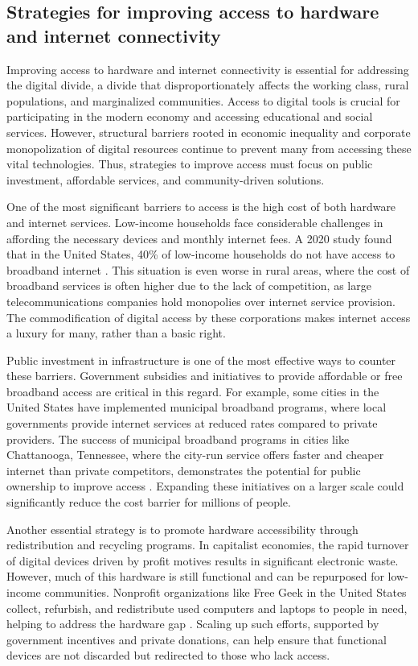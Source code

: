 \begin{refsection}
\subsection{Strategies for improving access to hardware and internet connectivity}

Improving access to hardware and internet connectivity is essential for addressing the digital divide, a divide that disproportionately affects the working class, rural populations, and marginalized communities. Access to digital tools is crucial for participating in the modern economy and accessing educational and social services. However, structural barriers rooted in economic inequality and corporate monopolization of digital resources continue to prevent many from accessing these vital technologies. Thus, strategies to improve access must focus on public investment, affordable services, and community-driven solutions.

One of the most significant barriers to access is the high cost of both hardware and internet services. Low-income households face considerable challenges in affording the necessary devices and monthly internet fees. A 2020 study found that in the United States, 40\% of low-income households do not have access to broadband internet \cite[pp.~56-58]{pickdigitaldivide}. This situation is even worse in rural areas, where the cost of broadband services is often higher due to the lack of competition, as large telecommunications companies hold monopolies over internet service provision. The commodification of digital access by these corporations makes internet access a luxury for many, rather than a basic right.

Public investment in infrastructure is one of the most effective ways to counter these barriers. Government subsidies and initiatives to provide affordable or free broadband access are critical in this regard. For example, some cities in the United States have implemented municipal broadband programs, where local governments provide internet services at reduced rates compared to private providers. The success of municipal broadband programs in cities like Chattanooga, Tennessee, where the city-run service offers faster and cheaper internet than private competitors, demonstrates the potential for public ownership to improve access \cite[pp.~75-78]{fuchscriticalcommunication}. Expanding these initiatives on a larger scale could significantly reduce the cost barrier for millions of people.

Another essential strategy is to promote hardware accessibility through redistribution and recycling programs. In capitalist economies, the rapid turnover of digital devices driven by profit motives results in significant electronic waste. However, much of this hardware is still functional and can be repurposed for low-income communities. Nonprofit organizations like Free Geek in the United States collect, refurbish, and redistribute used computers and laptops to people in need, helping to address the hardware gap \cite[pp.~45-48]{robinsongreen}. Scaling up such efforts, supported by government incentives and private donations, can help ensure that functional devices are not discarded but redirected to those who lack access.


\end{refsection}

